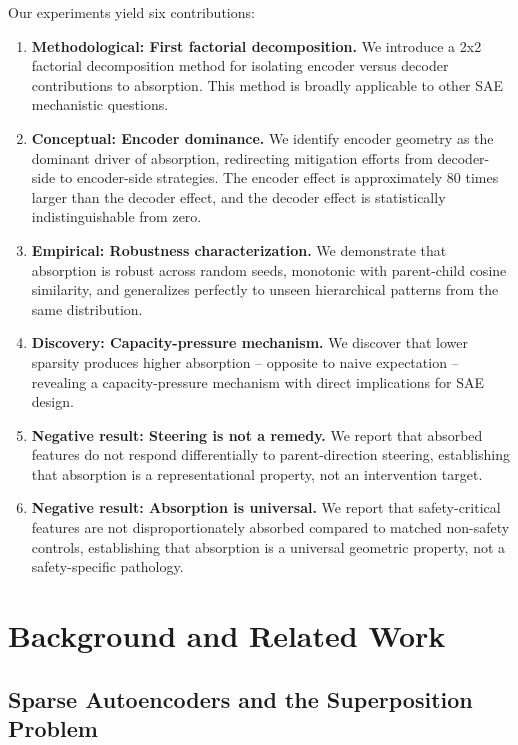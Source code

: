\documentclass{article}
\begin{document}
Our experiments yield six contributions:

\begin{enumerate}
\item \textbf{Methodological: First factorial decomposition.} We introduce a 2x2 factorial decomposition method for isolating encoder versus decoder contributions to absorption. This method is broadly applicable to other SAE mechanistic questions.

\item \textbf{Conceptual: Encoder dominance.} We identify encoder geometry as the dominant driver of absorption, redirecting mitigation efforts from decoder-side to encoder-side strategies. The encoder effect is approximately 80 times larger than the decoder effect, and the decoder effect is statistically indistinguishable from zero.

\item \textbf{Empirical: Robustness characterization.} We demonstrate that absorption is robust across random seeds, monotonic with parent-child cosine similarity, and generalizes perfectly to unseen hierarchical patterns from the same distribution.

\item \textbf{Discovery: Capacity-pressure mechanism.} We discover that lower sparsity produces higher absorption -- opposite to naive expectation -- revealing a capacity-pressure mechanism with direct implications for SAE design.

\item \textbf{Negative result: Steering is not a remedy.} We report that absorbed features do not respond differentially to parent-direction steering, establishing that absorption is a representational property, not an intervention target.

\item \textbf{Negative result: Absorption is universal.} We report that safety-critical features are not disproportionately absorbed compared to matched non-safety controls, establishing that absorption is a universal geometric property, not a safety-specific pathology.
\end{enumerate}

\section{Background and Related Work}

\subsection{Sparse Autoencoders and the Superposition Problem}
\end{document}
